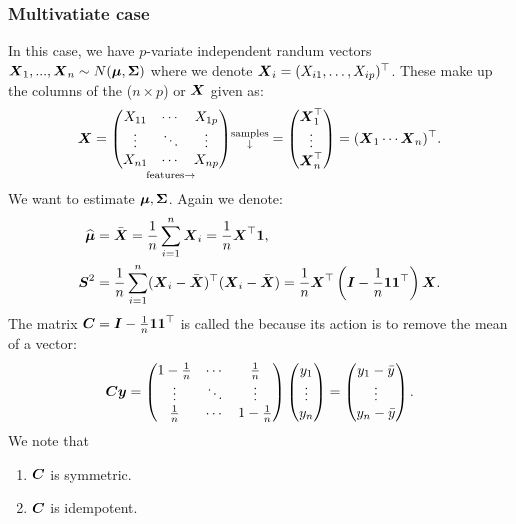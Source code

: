 \subsubsection{Multivatiate case}
In this case, we have $p$-variate independent randum vectors $\boldsymbol{X}_1,...,\boldsymbol{X}_n \sim N(\boldsymbol{\mu}, \boldsymbol{\Sigma})$ where we denote $\boldsymbol{X}_i=(X_{i1},\dots,X_{ip})^\top$. These make up the columns of the ($n\times p$)  or  $\boldsymbol{X}$ given as:
$$
    \boldsymbol{X} = 
    \underset{\mathrm{features} \rightarrow}{
    \begin{pmatrix}
        X_{11} & \cdots & X_{1p} \\
        \vdots & \ddots & \vdots \\
        X_{n1} & \cdots & X_{np}
    \end{pmatrix}}
    \substack{\text{samples} \\ \downarrow}
    = \begin{pmatrix}
        \boldsymbol{X}_1^\top \\ \vdots \\ \boldsymbol{X}_n^\top
    \end{pmatrix}= (\boldsymbol{X}_1 \cdots \boldsymbol{X}_n)^\top.
$$
We want to estimate $\boldsymbol{\mu}, \boldsymbol{\Sigma}$. Again we denote:
\begin{align*}
    \widehat{\boldsymbol{\mu}} &= \bar{\boldsymbol{X}} = \frac{1}{n} \sum_{i=1}^n \boldsymbol{X}_i = \frac{1}{n}\boldsymbol{X}^\top \boldsymbol{1}, \\
    \boldsymbol{S}^2 
    &= \frac{1}{n} \sum_{i=1}^n (\boldsymbol{X}_i-\bar{\boldsymbol{X}})^\top(\boldsymbol{X}_i-\bar{\boldsymbol{X}}) 
    = \frac{1}{n} \boldsymbol{X}^\top\left( \boldsymbol{I}-\frac{1}{n} \boldsymbol{1}\boldsymbol{1}^\top \right)\boldsymbol{X}.
\end{align*}
The matrix $\boldsymbol{C}=\boldsymbol{I}-\frac{1}{n} \boldsymbol{1}\boldsymbol{1}^\top$ is called the  because its action is to remove the mean of a vector:
$$
    \boldsymbol{C} \boldsymbol{y} = \begin{pmatrix}
        1-\frac{1}{n} & \cdots & \frac{1}{n} \\
        \vdots & \ddots & \vdots \\
        \frac{1}{n} & \cdots & 1-\frac{1}{n}
    \end{pmatrix}
    \begin{pmatrix}
        y_1 \\ \vdots \\ y_n
    \end{pmatrix}
    = 
    \begin{pmatrix}
        y_1-\bar{y} \\ \vdots \\ y_n-\bar{y}
    \end{pmatrix}.
$$
We note that 
\begin{enumerate}
    \item $\boldsymbol{C}$ is symmetric.
    \item $\boldsymbol{C}$ is idempotent.
\end{enumerate}
